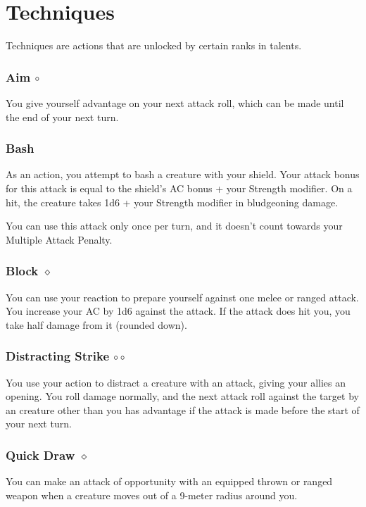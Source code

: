\section{Techniques} %
Techniques are actions that are unlocked by certain ranks in talents. %


\subsubsection{Aim $\circ$} \label{act::aim}
    You give yourself advantage on your next attack roll, which can be made until the end of your next turn.

\subsubsection{Bash} \label{act::bash}
    As an action, you attempt to bash a creature with your shield.
    Your attack bonus for this attack is equal to the shield's AC bonus + your Strength modifier.
    On a hit, the creature takes 1d6 + your Strength modifier in bludgeoning damage.

    You can use this attack only once per turn, and it doesn't count towards your Multiple Attack Penalty.

\subsubsection{Block $\diamond$} \label{act::block}
    You can use your reaction to prepare yourself against one melee or ranged attack.
    You increase your AC by 1d6 against the attack.
    If the attack does hit you, you take half damage from it (rounded down).

\subsubsection{Distracting Strike $\circ\circ$} \label{act::distractingstrike}
    You use your action to distract a creature with an attack, giving your allies an opening.
    You roll damage normally, and the next attack roll against the target by an creature other than you has advantage if the attack is made before the start of your next turn.

\subsubsection{Quick Draw $\diamond$} \label{act::quickdraw}
    You can make an attack of opportunity with an equipped thrown or ranged weapon when a creature moves out of a 9-meter radius around you.

